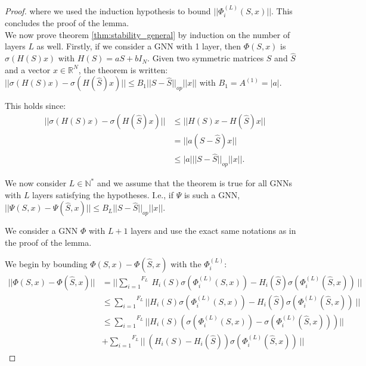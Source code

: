\documentclass[11pt,a4paper]{article}
\newcommand{\op}[1]{|| #1 ||_{op}}
\newcommand{\Sum}[2]{\overset{#2}{\underset{#1}{\sum}}}
\theoremstyle{definition}
\renewcommand{\leq}{\leqslant}
\begin{document}
\begin{proof}
            where we used the induction hypothesis to bound $|| \Phi^{(L)}_i(S,x) ||$. This concludes the proof of the lemma.\\
        
            We now prove theorem \ref{thm:stability_general} by induction on the number of layers $L$ as well.
            Firstly, if we consider a GNN with 1 layer, then $\Phi(S,x)$ is $\sigma(H(S)x)$ with $H(S) = aS + b I_N$. Given two symmetric matrices $S$ and $\hat{S}$ and a vector $x \in \mathbb{R}^N$, the theorem is written:
                $|| \sigma(H(S)x) - \sigma(H(\hat{S})x) || \leq B_1 \op{S - \hat{S}} ||x||$ with $B_1 = A^{(1)} = |a|$.

                This holds since:
                \begin{align*}
                    || \sigma(H(S)x) - \sigma(H(\hat{S})x) || &\leq || H(S)x - H(\hat{S})x || \\
                    &= || a (S - \hat{S}) x|| \\
                    &\leq |a| \op{S - \hat{S}} ||x||.
                \end{align*}
            
            We now consider $L \in \mathbb{N}^*$ and we assume that the theorem is true for all GNNs with $L$ layers satisfying the hypotheses. I.e., if $\Psi$ is such a GNN, $|| \Psi (S,x) - \Psi (\hat{S},x) || \leq B_L \op{S - \hat{S}} ||x||.$

            We consider a GNN $\Phi$ with $L+1$ layers and use the exact same notations as in the proof of the lemma.


            We begin by bounding $\Phi(S,x) - \Phi(\hat{S},x)$ with the $\Phi^{(L)}_i$:
            \begin{align}
                || \Phi (S,x) - \Phi (\hat{S},x) || &= || \Sum{i=1}{F_L} \ H_i (S) \sigma(\Phi^{(L)}_i (S,x)) - H_i (\hat{S}) \sigma (\Phi^{(L)}_i (\hat{S},x)) \ || \nonumber \\
                &\leq \Sum{i=1}{F_L} || H_i (S) \sigma(\Phi^{(L)}_i (S,x)) - H_i (\hat{S}) \sigma (\Phi^{(L)}_i (\hat{S},x)) \ || \nonumber \\
                &\leq \Sum{i=1}{F_L}  || H_i (S) \left(\sigma(\Phi^{(L)}_i (S,x)) - \sigma (\Phi^{(L)}_i (\hat{S},x)) \right) || \nonumber \\
                &+  \Sum{i=1}{F_L} || \ (H_i(S) - H_i(\hat{S}) ) \sigma (\Phi^{(L)}_i (\hat{S},x)) \ || 
                \label{eq:bound_phi_raw}
            \end{align}


\end{proof}
\end{document}
